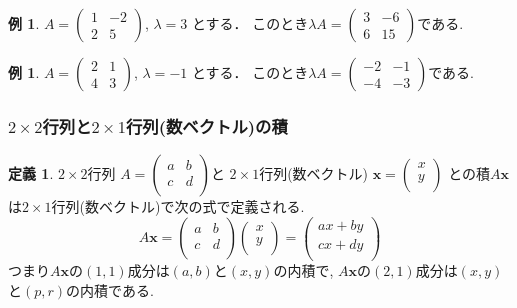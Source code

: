 \documentclass[dvipdfmx,a4paper,11pt]{article}
\theoremstyle{definition}
\newtheorem{dfn}[thm]{定義}
\newtheorem{exa}[thm]{例}
\begin{document}
\begin{exa}
 $A = 
 \begin{pmatrix}
 1 &-2 \\
 2&5
 \end{pmatrix}
 $,
 $
 \lambda =3
 $
 とする．
 このとき$
 \lambda A =
 \begin{pmatrix}
 3 &-6 \\
 6&15
 \end{pmatrix}
 $である.
 \end{exa}
 \begin{exa}
 $A = 
 \begin{pmatrix}
 2&1 \\
 4&3
 \end{pmatrix}
 $, 
 $
 \lambda =-1
 $
 とする．
 このとき$
 \lambda A =
 \begin{pmatrix}
 -2 &-1 \\
-4&-3
 \end{pmatrix}
 $である.
 \end{exa}
 
 \subsubsection{$2\times 2$行列と$2 \times 1$行列(数ベクトル)の積}
  \begin{tcolorbox}[
    colback = white,
    colframe = green!35!black,
    fonttitle = \bfseries,
    breakable = true]
    \begin{dfn}
    
$2 \times 2$行列
$
A=\begin{pmatrix}
a& b \\
c& d \\
\end{pmatrix}
$と 
$2 \times 1$行列(数ベクトル)
$
\bm{x}=
\begin{pmatrix}
x \\
y\\
\end{pmatrix}
$
との積$A\bm{x}$は$2 \times 1$行列(数ベクトル)で次の式で定義される.
$$
A\bm{x}=
\begin{pmatrix}
a& b \\
c& d \\
\end{pmatrix}
\begin{pmatrix}
x \\
y\\
\end{pmatrix}
=
\begin{pmatrix}
ax + by \\
cx + dy\\
\end{pmatrix}
$$
つまり$A\bm{x}$の$(1,1)$成分は$(a,b)$と$(x,y)$の内積で, $A\bm{x}$の$(2,1)$成分は$(x,y)$と$(p,r)$の内積である. 
  \end{dfn}
 \end{tcolorbox}
 
\end{document}
